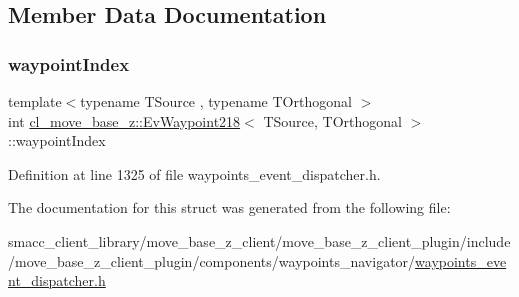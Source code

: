\subsection{Member Data Documentation}
\mbox{\label{structcl__move__base__z_1_1EvWaypoint218_a47f2afe7025f6c7932d7155e5a63b95f}} 
\subsubsection{\texorpdfstring{waypoint\+Index}{waypointIndex}}
{\footnotesize\ttfamily template$<$typename T\+Source , typename T\+Orthogonal $>$ \\
int \hyperlink{structcl__move__base__z_1_1EvWaypoint218}{cl\+\_\+move\+\_\+base\+\_\+z\+::\+Ev\+Waypoint218}$<$ T\+Source, T\+Orthogonal $>$\+::waypoint\+Index}



Definition at line 1325 of file waypoints\+\_\+event\+\_\+dispatcher.\+h.



The documentation for this struct was generated from the following file\+:\begin{DoxyCompactItemize}
\item 
smacc\+\_\+client\+\_\+library/move\+\_\+base\+\_\+z\+\_\+client/move\+\_\+base\+\_\+z\+\_\+client\+\_\+plugin/include/move\+\_\+base\+\_\+z\+\_\+client\+\_\+plugin/components/waypoints\+\_\+navigator/\hyperlink{waypoints__event__dispatcher_8h}{waypoints\+\_\+event\+\_\+dispatcher.\+h}\end{DoxyCompactItemize}
